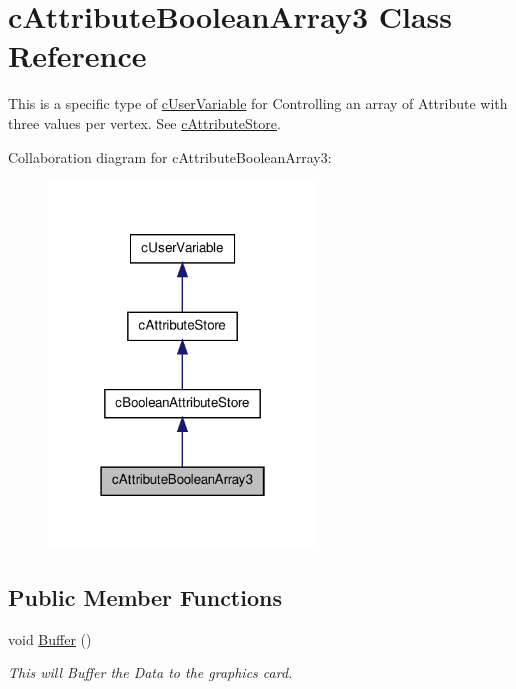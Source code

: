 \hypertarget{classc_attribute_boolean_array3}{
\section{cAttributeBooleanArray3 Class Reference}
\label{classc_attribute_boolean_array3}
}


This is a specific type of \hyperlink{classc_user_variable}{cUserVariable} for Controlling an array of Attribute with three values per vertex. See \hyperlink{classc_attribute_store}{cAttributeStore}.  




Collaboration diagram for cAttributeBooleanArray3:\nopagebreak
\begin{figure}[H]
\begin{center}
\leavevmode
\includegraphics[width=202pt]{classc_attribute_boolean_array3__coll__graph}
\end{center}
\end{figure}
\subsection*{Public Member Functions}
\begin{DoxyCompactItemize}
\item 
\hypertarget{classc_attribute_boolean_array3_a5641b070ad97efab41b2c3aa5337ccab}{
void \hyperlink{classc_attribute_boolean_array3_a5641b070ad97efab41b2c3aa5337ccab}{Buffer} ()}
\label{classc_attribute_boolean_array3_a5641b070ad97efab41b2c3aa5337ccab}

\begin{DoxyCompactList}\small\item\em This will Buffer the Data to the graphics card. \end{DoxyCompactList}\end{DoxyCompactItemize}


